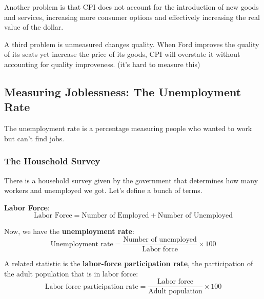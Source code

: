 \documentclass[12pt]{article}
\begin{document}
Another problem is that CPI does not account for the introduction of new goods and services, increasing more consumer options and effectively increasing the real value of the dollar.

A third problem is unmeasured changes quality. When Ford improves the quality of its seats yet increase the price of its goods, CPI will overstate it without accounting for quality improveness. (it's hard to measure this)

\newpage

\subsection{Measuring Joblessness: The Unemployment Rate}

The unemployment rate is a percentage measuring people who wanted to work but can't find jobs.

\subsubsection{The Household Survey}

There is a household survey given by the government that determines how many workers and unemployed we got. Let's define a bunch of terms.

\textbf{Labor Force}:
$$\text{Labor Force} = \text{Number of Employed} + \text{Number of Unemployed}$$

Now, we have the \textbf{unemployment rate}:
$$\text{Unemployment rate} = \frac{\text{Number of unemployed}}{\text{Labor force}} \times 100$$

A related statistic is the \textbf{labor-force participation rate}, the participation of the adult population that is in labor force:
$$\text{Labor force participation rate} = \frac{\text{Labor force}}{\text{Adult population}} \times 100$$
\end{document}
